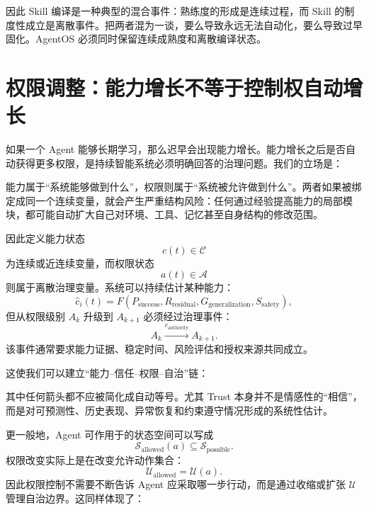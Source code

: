因此 Skill 编译是一种典型的混合事件：熟练度的形成是连续过程，而 Skill 的制度性成立是离散事件。把两者混为一谈，要么导致永远无法自动化，要么导致过早固化。AgentOS 必须同时保留连续成熟度和离散编译状态。

\section{权限调整：能力增长不等于控制权自动增长}

如果一个 Agent 能够长期学习，那么迟早会出现能力增长。能力增长之后是否自动获得更多权限，是持续智能系统必须明确回答的治理问题。我们的立场是：
\begin{statementbox}
\centering
{}
\end{statementbox}
能力属于“系统能够做到什么”，权限则属于“系统被允许做到什么”。两者如果被绑定成同一个连续变量，就会产生严重结构风险：任何通过经验提高能力的局部模块，都可能自动扩大自己对环境、工具、记忆甚至自身结构的修改范围。

因此定义能力状态
\[
c(t)\in\mathcal C
\]
为连续或近连续变量，而权限状态
\[
a(t)\in\mathcal A
\]
则属于离散治理变量。系统可以持续估计某种能力：
\[
\hat c_i(t)
=
F(
P_{\mathrm{success}},
R_{\mathrm{residual}},
G_{\mathrm{generalization}},
S_{\mathrm{safety}}
),
\]
但从权限级别 \(A_k\) 升级到 \(A_{k+1}\) 必须经过治理事件：
\[
A_k
\xrightarrow{
e_{\mathrm{authority}}
}
A_{k+1}.
\]
该事件通常要求能力证据、稳定时间、风险评估和授权来源共同成立。

这使我们可以建立“能力--信任--权限--自治”链：
\begin{statementbox}
\centering
{}
\end{statementbox}
其中任何箭头都不应被简化成自动等号。尤其 Trust 本身并不是情感性的“相信”，而是对可预测性、历史表现、异常恢复和约束遵守情况形成的系统性估计。

更一般地，Agent 可作用于的状态空间可以写成
\[
\mathcal S_{\mathrm{allowed}}(a)
\subseteq
\mathcal S_{\mathrm{possible}}.
\]
权限改变实际上是在改变允许动作集合：
\[
\mathcal U_{\mathrm{allowed}}
=
\mathcal U(a).
\]
因此权限控制不需要不断告诉 Agent 应采取哪一步行动，而是通过收缩或扩张 \(\mathcal U\) 管理自治边界。这同样体现了：
\begin{statementbox}
\centering
{}
\end{statementbox}

